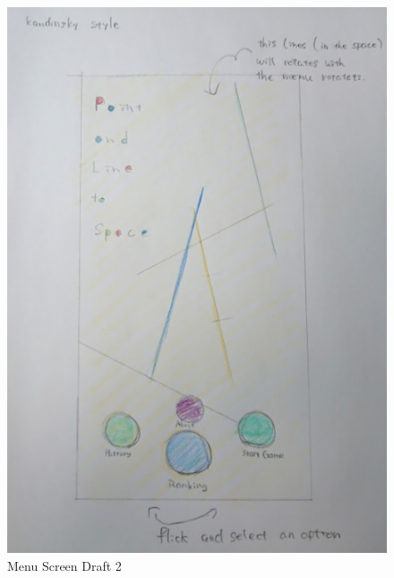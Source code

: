 \begin{figure}[htbp]
	\centering
		\includegraphics[width=1.00\textwidth]{img/Menu2.png}
	\caption[Menu Screen Draft 2]{Menu Screen Draft 2}
	\label{fig:Menu2}
\end{figure}
